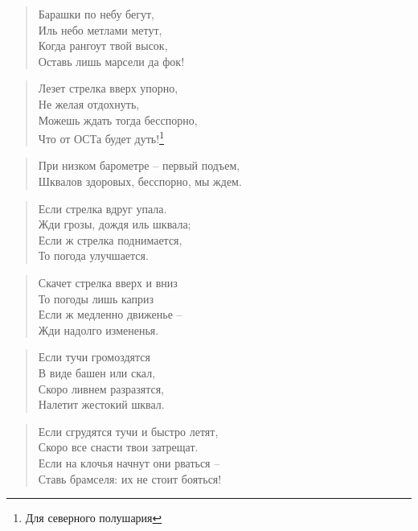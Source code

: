 \documentclass[a4paper, 12pt, twoside, final, book, russian, fittopage, cyremdash]{ncc}
\begin{document}
\begin{quote}
Барашки по небу бегут, \\
Иль небо метлами метут, \\
Когда рангоут твой высок, \\
Оставь лишь марсели да фок!
\end{quote}

\begin{quote}
Лезет стрелка вверх упорно, \\
Не желая отдохнуть, \\
Можешь ждать тогда бесспорно, \\
Что от ОСТа будет дуть!\footnote{Для северного полушария}
\end{quote}

\begin{quote}
При низком барометре \--- первый подъем, \\
Шквалов здоровых, бесспорно, мы ждем.
\end{quote}

\begin{quote}
Если стрелка вдруг упала. \\
Жди грозы, дождя иль шквала; \\
Если ж стрелка поднимается, \\
То погода улучшается.
\end{quote}

\begin{quote}
Скачет стрелка вверх и вниз \\
То погоды лишь каприз \\
Если ж медленно движенье \--- \\
Жди надолго измененья.
\end{quote}

\begin{quote}
Если тучи громоздятся \\
В виде башен или скал, \\
Скоро ливнем разразятся, \\
Налетит жестокий шквал.
\end{quote}

\begin{quote}
Если сгрудятся тучи и быстро летят, \\
Скоро все снасти твои затрещат. \\
Если на клочья начнут они рваться \--- \\
Ставь брамселя: их не стоит бояться!
\end{quote}
\end{document}
